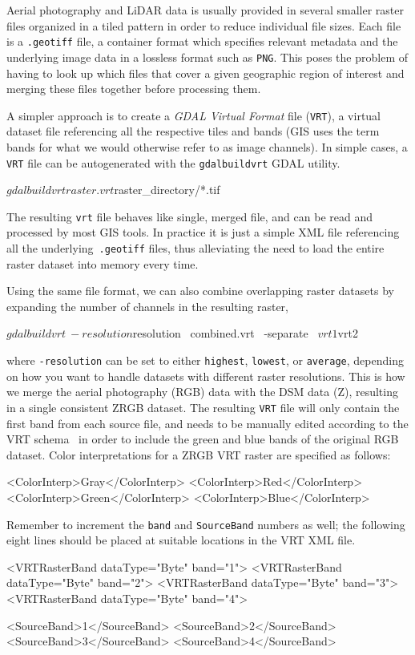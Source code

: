 Aerial photography and LiDAR data is usually provided in several smaller raster files organized in a tiled pattern in order to reduce individual file sizes.
Each file is a \texttt{.geotiff} file, a container format which specifies relevant metadata and the underlying image data in a lossless format such as \texttt{PNG}.
This poses the problem of having to look up which files that cover a given geographic region of interest and merging these files together before processing them.

A simpler approach is to create a \textit{GDAL Virtual Format} file (\texttt{VRT}), a virtual dataset file referencing all the respective tiles and bands (GIS uses the term bands for what we would otherwise refer to as image channels).
In simple cases, a \texttt{VRT} file can be autogenerated with the \texttt{gdalbuildvrt} GDAL utility.

\begin{shellcode}
$ gdalbuildvrt raster.vrt ${raster_directory}/*.tif
\end{shellcode}
%
The resulting \texttt{vrt} file behaves like single, merged file, and can be read and processed by most GIS tools.
In practice it is just a simple XML file referencing all the underlying\ \texttt{.geotiff} files, thus alleviating the need to load the entire raster dataset into memory every time.

Using the same file format, we can also combine overlapping raster datasets by expanding the number of channels in the resulting raster,
\begin{shellcode}
$ gdalbuildvrt \
  -resolution ${resolution} \
  combined.vrt \
  -separate \
  ${vrt1} ${vrt2} 
\end{shellcode}
where \texttt{-resolution} can be set to either \texttt{highest}, \texttt{lowest}, or \texttt{average}, depending on how you want to handle datasets with different raster resolutions.
This is how we merge the aerial photography (RGB) data with the DSM data (Z), resulting in a single consistent ZRGB dataset.
The resulting \texttt{VRT} file will only contain the first band from each source file, and needs to be manually edited according to the VRT schema~\cite{vrt_schema_2015} in order to include the green and blue bands of the original RGB dataset.
Color interpretations for a ZRGB VRT raster are specified as follows:

\begin{xmlcode}
<ColorInterp>Gray</ColorInterp>
<ColorInterp>Red</ColorInterp>
<ColorInterp>Green</ColorInterp>
<ColorInterp>Blue</ColorInterp>
\end{xmlcode}

Remember to increment the \texttt{band} and \texttt{SourceBand} numbers as well; the following eight lines should be placed at suitable locations in the VRT XML file.

\begin{xmlcode}
<VRTRasterBand dataType="Byte" band="1">
<VRTRasterBand dataType="Byte" band="2">
<VRTRasterBand dataType="Byte" band="3">
<VRTRasterBand dataType="Byte" band="4">

<SourceBand>1</SourceBand>
<SourceBand>2</SourceBand>
<SourceBand>3</SourceBand>
<SourceBand>4</SourceBand>
\end{xmlcode}
